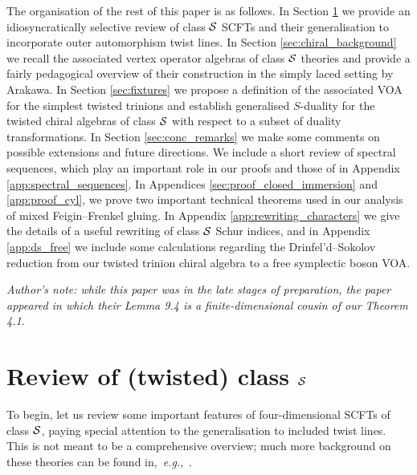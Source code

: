 \documentclass[a4paper]{article}
\def\SS{{\cal S}}
\def \eg{{\it e.g.}}
\begin{document}
The organisation of the rest of this paper is as follows. In Section \ref{sec:twisted_background} we provide an idiosyncratically selective review of class $\SS$ SCFTs and their generalisation to incorporate outer automorphism twist lines. In Section \ref{sec:chiral_background} we recall the associated vertex operator algebras of class $\SS$ theories and provide a fairly pedagogical overview of their construction in the simply laced setting by Arakawa. In Section \ref{sec:fixtures} we propose a definition of the associated VOA for the simplest twisted trinions and establish generalised $S$-duality for the twisted chiral algebras of class $\SS$ with respect to a subset of duality transformations. In Section \ref{sec:conc_remarks} we make some comments on possible extensions and future directions. We include a short review of spectral sequences, which play an important role in our proofs and those of \cite{Arakawa:2018egx} in Appendix \ref{app:spectral_sequences}. In Appendices \ref{sec:proof_closed_immersion} and \ref{app:proof_cyl}, we prove two important technical theorems used in our analysis of mixed Feigin--Frenkel gluing. In Appendix \ref{app:rewriting_characters} we give the details of a useful rewriting of class $\SS$ Schur indices, and in Appendix \ref{app:ds_free} we include some calculations regarding the Drinfel'd--Sokolov reduction from our twisted trinion chiral algebra to a free symplectic boson VOA.

\emph{Author's note: while this paper was in the late stages of preparation, the paper~\cite{Frenkel:2021bmx} appeared in which their Lemma 9.4 is a finite-dimensional cousin of our Theorem 4.1.}


\section{Review of (twisted) class \texorpdfstring{$\SS$}{S}}
\label{sec:twisted_background}

To begin, let us review some important features of four-dimensional SCFTs of class $\SS$, paying special attention to the generalisation to included twist lines. This is not meant to be a comprehensive overview; much more background on these theories can be found in,~\eg,~\cite{Gaiotto:2009we, Gaiotto:2009hg, Tachikawa:2011}.
\end{document}
